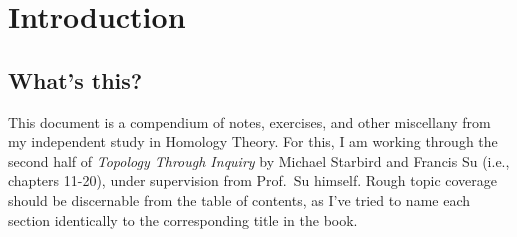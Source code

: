 \documentclass{fkbook}
\begin{document}
\pagestyle{plain}
\frontmatter


\maketitlepage
\tableofcontents

\chapter{Introduction}
\section*{What's this?}\noindent\indent
This document is a compendium of notes, exercises, and other miscellany from my
independent study in Homology Theory. For this, I am working through the second
half of \emph{Topology Through Inquiry} by Michael Starbird and Francis Su
(i.e., chapters 11-20), under supervision from Prof.\ Su himself. Rough topic
coverage should be discernable from the table of contents, as I've tried to
name each section identically to the corresponding title in the book.
\end{document}
